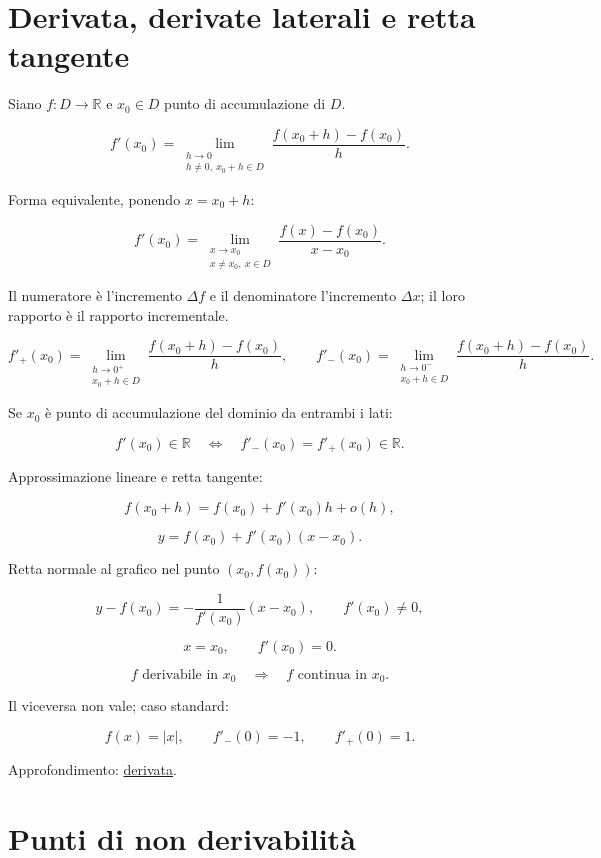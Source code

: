 \section{Derivata, derivate laterali e retta tangente}\label{derivata-derivate-laterali-e-retta-tangente}

Siano \(f:D\to\mathbb R\) e \(x_0\in D\) punto di accumulazione di \(D\).

\[
\displaystyle
f'(x_0)=
\lim_{\substack{h\to0\\h\ne0,\ x_0+h\in D}}
\frac{f(x_0+h)-f(x_0)}{h}.
\]

Forma equivalente, ponendo \(x=x_0+h\):

\[
f'(x_0)
=\lim_{\substack{x\to x_0\\x\ne x_0,\ x\in D}}
\frac{f(x)-f(x_0)}{x-x_0}.
\]

Il numeratore è l'incremento \(\Delta f\) e il denominatore l'incremento \(\Delta x\); il loro rapporto è il rapporto incrementale.

\[
\displaystyle
f'_+(x_0)=
\lim_{\substack{h\to0^+\\x_0+h\in D}}
\frac{f(x_0+h)-f(x_0)}{h},
\qquad
f'_-(x_0)=
\lim_{\substack{h\to0^-\\x_0+h\in D}}
\frac{f(x_0+h)-f(x_0)}{h}.
\]

Se \(x_0\) è punto di accumulazione del dominio da entrambi i lati:

\[
\displaystyle
f'(x_0)\in\mathbb R
\quad\Longleftrightarrow\quad
f'_-(x_0)=f'_+(x_0)\in\mathbb R.
\]

Approssimazione lineare e retta tangente:

\[
\displaystyle
f(x_0+h)=f(x_0)+f'(x_0)h+o(h),
\]

\[
\displaystyle
y=f(x_0)+f'(x_0)(x-x_0).
\]

Retta normale al grafico nel punto \((x_0,f(x_0))\):

\[
y-f(x_0)=-\frac{1}{f'(x_0)}(x-x_0),
\qquad f'(x_0)\ne0,
\]

\[
x=x_0,
\qquad f'(x_0)=0.
\]

\[
\displaystyle
f\text{ derivabile in }x_0
\quad\Longrightarrow\quad
f\text{ continua in }x_0.
\]

Il viceversa non vale; caso standard:

\[
\displaystyle
f(x)=|x|,
\qquad
f'_-(0)=-1,
\qquad
f'_+(0)=1.
\]

Approfondimento: \href{https://ingegnerismo.it/matematica/derivata/}{derivata}.

\section{Punti di non derivabilità}\label{punti-di-non-derivabilituxe0}

